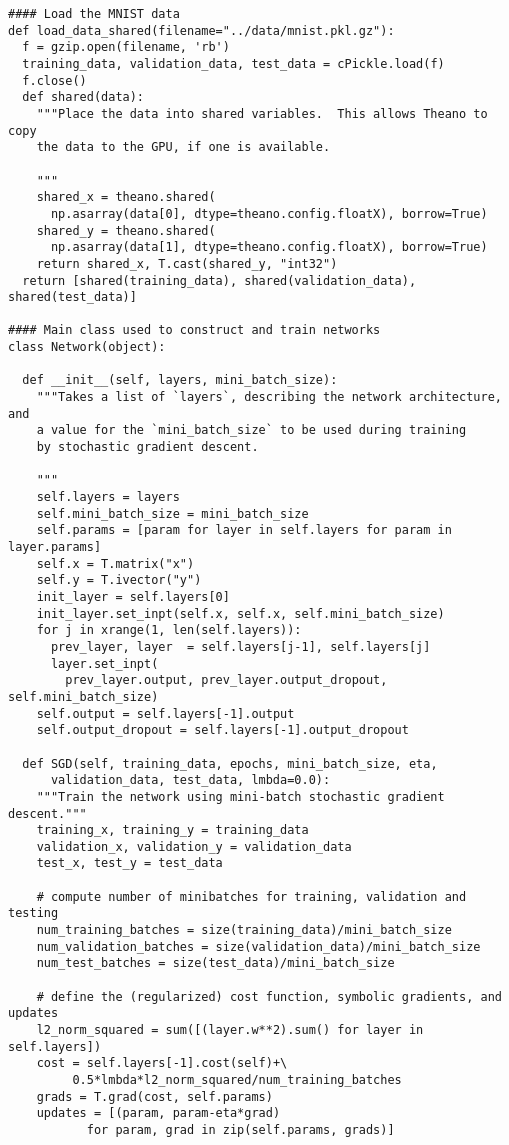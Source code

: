 \documentclass[a4paper,twoside,10pt]{book}
\begin{document}
\begin{lstlisting}
#### Load the MNIST data
def load_data_shared(filename="../data/mnist.pkl.gz"):
  f = gzip.open(filename, 'rb')
  training_data, validation_data, test_data = cPickle.load(f)
  f.close()
  def shared(data):
    """Place the data into shared variables.  This allows Theano to copy
    the data to the GPU, if one is available.

    """
    shared_x = theano.shared(
      np.asarray(data[0], dtype=theano.config.floatX), borrow=True)
    shared_y = theano.shared(
      np.asarray(data[1], dtype=theano.config.floatX), borrow=True)
    return shared_x, T.cast(shared_y, "int32")
  return [shared(training_data), shared(validation_data), shared(test_data)]

#### Main class used to construct and train networks
class Network(object):

  def __init__(self, layers, mini_batch_size):
    """Takes a list of `layers`, describing the network architecture, and
    a value for the `mini_batch_size` to be used during training
    by stochastic gradient descent.

    """
    self.layers = layers
    self.mini_batch_size = mini_batch_size
    self.params = [param for layer in self.layers for param in layer.params]
    self.x = T.matrix("x")
    self.y = T.ivector("y")
    init_layer = self.layers[0]
    init_layer.set_inpt(self.x, self.x, self.mini_batch_size)
    for j in xrange(1, len(self.layers)):
      prev_layer, layer  = self.layers[j-1], self.layers[j]
      layer.set_inpt(
        prev_layer.output, prev_layer.output_dropout, self.mini_batch_size)
    self.output = self.layers[-1].output
    self.output_dropout = self.layers[-1].output_dropout

  def SGD(self, training_data, epochs, mini_batch_size, eta,
      validation_data, test_data, lmbda=0.0):
    """Train the network using mini-batch stochastic gradient descent."""
    training_x, training_y = training_data
    validation_x, validation_y = validation_data
    test_x, test_y = test_data

    # compute number of minibatches for training, validation and testing
    num_training_batches = size(training_data)/mini_batch_size
    num_validation_batches = size(validation_data)/mini_batch_size
    num_test_batches = size(test_data)/mini_batch_size

    # define the (regularized) cost function, symbolic gradients, and updates
    l2_norm_squared = sum([(layer.w**2).sum() for layer in self.layers])
    cost = self.layers[-1].cost(self)+\
         0.5*lmbda*l2_norm_squared/num_training_batches
    grads = T.grad(cost, self.params)
    updates = [(param, param-eta*grad)
           for param, grad in zip(self.params, grads)]


\end{lstlisting}
\end{document}
